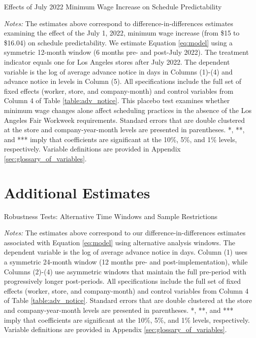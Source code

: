 \documentclass[letterpaper,11pt,leqno]{article}
\theoremstyle{paper}
\newcommand{\note}[2][]{\parbox{\textwidth}{\footnotesize\vspace*{10pt}\textit{#1}#2}}
\begin{document}
\begin{singlespace}
\begin{table}[h]
\caption{Effects of July 2022 Minimum Wage Increase on Schedule Predictability}

\note{\scriptsize \textit{Notes: } The estimates above correspond to difference-in-differences estimates examining the effect of the July 1, 2022, minimum wage increase (from \$15 to \$16.04) on schedule predictability. We estimate Equation \ref{eq:model} using a symmetric 12-month window (6 months pre- and post-July 2022). The treatment indicator equals one for Los Angeles stores after July 2022. The dependent variable is the log of average advance notice in days in Columns (1)-(4) and advance notice in levels in Column (5). All specifications include the full set of fixed effects (worker, store, and company-month) and control variables from Column 4 of Table \ref{table:adv_notice}. This placebo test examines whether minimum wage changes alone affect scheduling practices in the absence of the Los Angeles Fair Workweek requirements. Standard errors that are double clustered at the store and company-year-month levels are presented in parentheses. *, **, and *** imply that coefficients are significant at the 10\%, 5\%, and 1\% levels, respectively. Variable definitions are provided in Appendix \ref{sec:glossary_of_variables}.}
\label{table:adv_notice_mw_2022}
\end{table}
\end{singlespace}
\newpage 
\section{Additional Estimates}


\begin{singlespace}
\begin{table}[h]
\caption{Robustness Tests: Alternative Time Windows and Sample Restrictions}

\note{ \scriptsize \textit{Notes: } The estimates above correspond to our difference-in-differences estimates associated with Equation \ref{eq:model} using alternative analysis windows. The dependent variable is the log of average advance notice in days. Column (1) uses a symmetric 24-month window (12 months pre- and post-implementation), while Columns (2)-(4) use asymmetric windows that maintain the full pre-period with progressively longer post-periods. All specifications include the full set of fixed effects (worker, store, and company-month) and control variables from Column 4 of Table \ref{table:adv_notice}. Standard errors that are double clustered at the store and company-year-month levels are presented in parentheses. *, **, and *** imply that coefficients are significant at the 10\%, 5\%, and 1\% levels, respectively. Variable definitions are provided in Appendix \ref{sec:glossary_of_variables}.}
\label{table:time_windows}
\end{table}
\end{singlespace}
\end{document}
